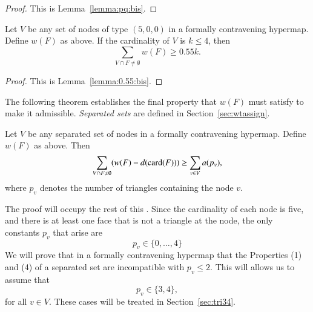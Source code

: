 \begin{proof} This is Lemma~\ref{lemma:pq:bis}.
\end{proof}

\begin{lemma} Let $V$ be any set of nodes of type $(5,0,0)$ in a
formally contravening hypermap.  Define $w(F)$ as above.
        If the cardinality of $V$ is $k\le 4$,
        then
        $$\sum_{V\cap F\ne\emptyset} w(F) \ge 0.55 k.$$
\end{lemma}

\begin{proof} This is Lemma~\ref{lemma:0.55:bis}.
\end{proof}

The following theorem establishes the final property that $w(F)$
must satisfy to make it admissible.  {\it Separated sets\/} are
defined in Section~\ref{sec:wtassign}.

\begin{theorem}
        \label{proposition:excess}
        Let $V$ be any separated set of nodes in a formally contravening hypermap.
        Define $w(F)$ as above.
        Then
        $$\sum_{V\cap F\ne\emptyset} (w(F) -d({\operatorname{card}}(F)))
            \ge \sum_{v\in V} a(p_v),$$
        where $p_v$ denotes the number of triangles containing
        the node $v$.
\end{theorem}

The proof will occupy the rest of this \chap. Since the cardinality
of each node is five, and there is at least one face that is not a
triangle at the node, the only constants $p_v$ that arise are
    $$p_v \in\{0,\ldots,4\}$$
We will prove that in a formally contravening hypermap that the
Properties (1) and (4) of a separated set are incompatible with
$p_v\le 2$.  This will allows us to assume that
$$p_v\in\{3,4\},$$ for all $v\in V$.  These cases will be treated in
Section~\ref{sec:tri34}.

